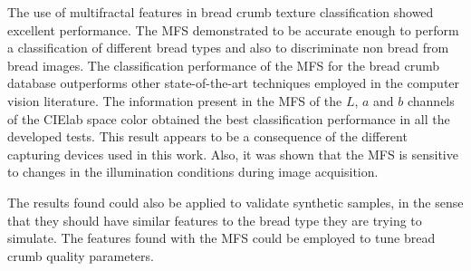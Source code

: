 The use of multifractal features in bread crumb texture classification showed excellent performance. The MFS demonstrated to be accurate enough to perform a classification of different bread types and also to discriminate non bread from bread images. The classification performance of the MFS for the bread crumb database outperforms other state-of-the-art techniques employed in the computer vision literature. The information present in the MFS of the $L$, $a$ and $b$ channels of the CIElab space color obtained the best classification performance in all the developed tests. This result appears to be a consequence of the different capturing devices used in this work. Also, it was shown that the MFS is sensitive to changes in the illumination conditions during image acquisition.

The results found could also be applied to validate synthetic samples, in the sense that they should have similar features to the bread type they are trying to simulate. The features found with the MFS could be employed to tune bread crumb quality parameters.



%
%



